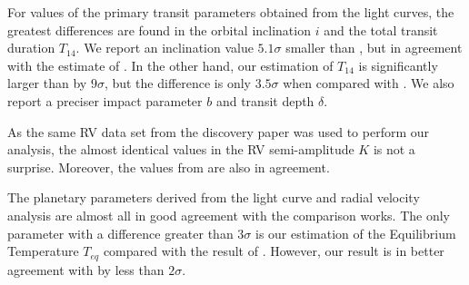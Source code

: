 For values of the primary transit parameters obtained from the light curves, the greatest differences are found in the orbital inclination $i$ and the total transit duration $T_{14}$. We report an inclination value $5.1\sigma$ smaller than \cite{Hebb2010}, but in agreement with the estimate of \cite{Lendl2013}. In the other hand, our estimation of $T_{14}$ is significantly larger than \cite{Hebb2010} by $9\sigma$, but the difference is only $3.5\sigma$ when compared with \cite{Lendl2013}. We also report a preciser impact parameter $b$ and transit depth $\delta$.

As the same RV data set from the discovery paper \citep{Hebb2010} was used to perform our analysis, the almost identical values in the RV semi-amplitude $K$ is not a surprise. Moreover, the values from \cite{Lendl2013} are also in agreement. 

The planetary parameters derived from the light curve and radial velocity analysis are almost all in good agreement with the comparison works. The only parameter with a difference greater than $3\sigma$ is our estimation of the Equilibrium Temperature $T_{eq}$ compared with the result of \cite{Hebb2010}. However, our result is in better agreement with \cite{Lendl2013} by less than $2\sigma$.

